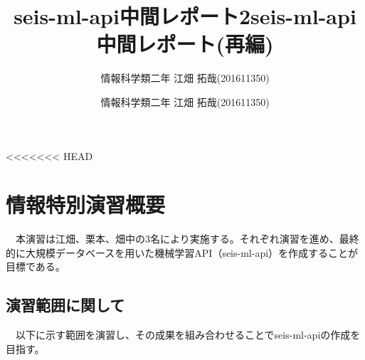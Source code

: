 \documentclass{scrartcl}
\author{情報科学類二年 江畑 拓哉(201611350)}
\date{}
\title{seis-ml-api中間レポート2}
\author{情報科学類二年 江畑 拓哉(201611350)}
\date{}
\title{seis-ml-api中間レポート(再編)}
\begin{document}
\maketitle
\tableofcontents


<<<<<<< HEAD
\section{情報特別演習概要}
\label{sec:org9f80ab5}
　本演習は江畑、栗本、畑中の3名により実施する。それぞれ演習を進め、最終的に大規模データベースを用いた機械学習API（seis-ml-api）を作成することが目標である。\\

\subsection{演習範囲に関して}
\label{sec:org40df129}
　以下に示す範囲を演習し、その成果を組み合わせることでseis-ml-apiの作成を目指す。\\
\end{document}
